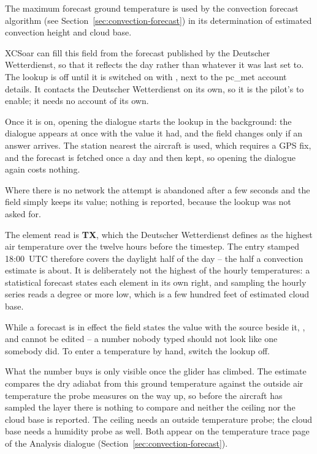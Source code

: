 The maximum forecast ground temperature is used by the convection
forecast algorithm (see Section~\ref{sec:convection-forecast}) in its
determination of estimated convection height and cloud base.

XCSoar can fill this field from the forecast published by the Deutscher
Wetterdienst, so that it reflects the day rather than whatever it was
last set to.  The lookup is off until it is switched on with
\blink{}\blink{}%
\blink{}\blink{}, next to the pc\_met account details.  It contacts the
Deutscher Wetterdienst on its own, so it is the pilot's to enable; it
needs no account of its own.

Once it is on, opening the dialogue starts the lookup in the
background: the dialogue appears at once with the value it had, and
the field changes only if an answer arrives.  The station nearest the
aircraft is used, which requires a GPS fix, and the forecast is
fetched once a day and then kept, so opening the dialogue again costs
nothing.

Where there is no network the attempt is abandoned after a few seconds
and the field simply keeps its value; nothing is reported, because the
lookup was not asked for.

The element read is \textbf{TX}, which the Deutscher Wetterdienst
defines as the highest air temperature over the twelve hours before
the timestep.  The entry stamped 18:00~UTC therefore covers the
daylight half of the day -- the half a convection estimate is about.
It is deliberately not the highest of the hourly temperatures: a
statistical forecast states each element in its own right, and
sampling the hourly series reads a degree or more low, which is a few
hundred feet of estimated cloud base.

While a forecast is in effect the field states the value with the
source beside it, , and cannot
be edited -- a number nobody typed should not look like one somebody
did.  To enter a temperature by hand, switch the lookup off.

\tip{} What the number buys is only visible once the glider has
climbed.  The estimate compares the dry adiabat from this ground
temperature against the outside air temperature the probe measures on
the way up, so before the aircraft has sampled the layer there is
nothing to compare and neither the ceiling nor the cloud base is
reported.  The ceiling needs an outside temperature probe; the cloud
base needs a humidity probe as well.  Both appear on the temperature
trace page of the Analysis dialogue
(Section~\ref{sec:convection-forecast}).

